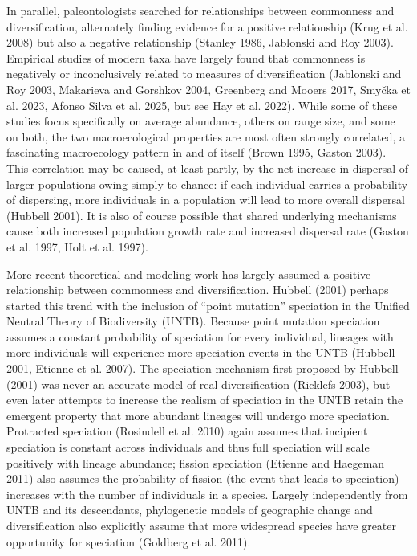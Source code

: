 \documentclass[
  letterpaper,
  DIV=11,
  numbers=noendperiod]{scrartcl}
\begin{document}
In parallel, paleontologists searched for relationships between
commonness and diversification, alternately finding evidence for a
positive relationship (Krug et al. 2008) but also a negative
relationship (Stanley 1986, Jablonski and Roy 2003). Empirical studies
of modern taxa have largely found that commonness is negatively or
inconclusively related to measures of diversification (Jablonski and Roy
2003, Makarieva and Gorshkov 2004, Greenberg and Mooers 2017, Smyčka et
al. 2023, Afonso Silva et al. 2025, but see Hay et al. 2022). While some
of these studies focus specifically on average abundance, others on
range size, and some on both, the two macroecological properties are
most often strongly correlated, a fascinating macroecology pattern in
and of itself (Brown 1995, Gaston 2003). This correlation may be caused,
at least partly, by the net increase in dispersal of larger populations
owing simply to chance: if each individual carries a probability of
dispersing, more individuals in a population will lead to more overall
dispersal (Hubbell 2001). It is also of course possible that shared
underlying mechanisms cause both increased population growth rate and
increased dispersal rate (Gaston et al. 1997, Holt et al. 1997).

More recent theoretical and modeling work has largely assumed a positive
relationship between commonness and diversification. Hubbell (2001)
perhaps started this trend with the inclusion of ``point mutation''
speciation in the Unified Neutral Theory of Biodiversity (UNTB). Because
point mutation speciation assumes a constant probability of speciation
for every individual, lineages with more individuals will experience
more speciation events in the UNTB (Hubbell 2001, Etienne et al. 2007).
The speciation mechanism first proposed by Hubbell (2001) was never an
accurate model of real diversification (Ricklefs 2003), but even later
attempts to increase the realism of speciation in the UNTB retain the
emergent property that more abundant lineages will undergo more
speciation. Protracted speciation (Rosindell et al. 2010) again assumes
that incipient speciation is constant across individuals and thus full
speciation will scale positively with lineage abundance; fission
speciation (Etienne and Haegeman 2011) also assumes the probability of
fission (the event that leads to speciation) increases with the number
of individuals in a species. Largely independently from UNTB and its
descendants, phylogenetic models of geographic change and
diversification also explicitly assume that more widespread species have
greater opportunity for speciation (Goldberg et al. 2011).
\end{document}
